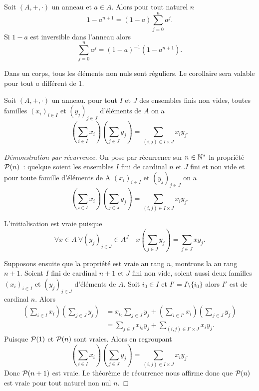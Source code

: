 \begin{corth}
  Soit \((A,+,\cdot)\) un anneau et \(a \in A\). Alors pour tout naturel \(n\)
  \begin{equation}
    1-a^{n+1}=(1-a)\sum_{j=0}^n a^j.
  \end{equation}
  Si \(1-a\) est inversible dans l'anneau alors
  \begin{equation}
    \sum_{j=0}^n a^j = (1-a)^{-1}(1-a^{n+1}).
  \end{equation}
\end{corth}
Dans un corps, tous les éléments non nuls sont réguliers. Le corollaire sera valable pour tout \(a\) différent de 1.

\begin{theo}
  Soit \((A,+,\cdot)\) un anneau. pour tout \(I\) et \(J\) des ensembles finis non vides, toutes familles \((x_i)_{i \in I}\) et \((y_j)_{j \in J}\) d'éléments de \(A\) on a
  \begin{equation}
    \left(\sum_{i \in I} x_i \right)\left(\sum_{j \in J} y_j \right) = \sum_{(i,j)\in I\times J} x_iy_j.
  \end{equation}
\end{theo}
\begin{proof}[Démonstration par récurrence]
  On pose par récurrence sur \(n \in \N^*\) la propriété \(\P(n)\)~: quelque soient les ensembles \(I\) fini de cardinal \(n\) et \(J\) fini et non vide et pour toute famille d'éléments de A \((x_i)_{i \in I}\) et \((y_j)_{j \in J}\) on a
\begin{equation} 
  \left(\sum_{i \in I} x_i \right)\left(\sum_{j \in J} y_j \right) = \sum_{(i,j)\in I\times J} x_iy_j.
\end{equation}

L'initialisation est vraie puisque
\begin{equation}
  \forall x \in A \ \forall (y_j)_{j \in J} \in A^J \quad x \left(\sum_{j \in J} y_j \right) = \sum_{j \in J} xy_j.
\end{equation}

Supposons ensuite que la propriété est vraie au rang \(n\), montrons la au rang \(n+1\). Soient \(I\) fini de cardinal \(n+1\) et \(J\) fini non vide, soient aussi deux familles \((x_i)_{i \in I}\) et \((y_j)_{j \in J}\) d'éléments de \(A\). Soit \(i_0 \in I\) et \(I'=I\setminus\{i_0\}\) alors \(I'\) est de cardinal \(n\). Alors
\begin{align}
  \left(\sum_{i \in I} x_i \right)\left(\sum_{j \in J} y_j \right) &=x_{i_0} \sum_{j \in J} y_j + \left(\sum_{i \in I'} x_i \right)\left(\sum_{j \in J} y_j \right) \\
&=\sum_{j \in J} x_{i_0}y_j +  \sum_{(i,j)\in I'\times J} x_iy_j.
\end{align}
Puisque \(\P(1)\) et \(\P(n)\) sont vraies. Alors en regroupant
\begin{equation}
  \left(\sum_{i \in I} x_i \right)\left(\sum_{j \in J} y_j \right) = \sum_{(i,j)\in I\times J} x_iy_j.
\end{equation}
Donc \(\P(n+1)\) est vraie. Le théorème de récurrence nous affirme donc que \(\P(n)\) est vraie pour tout naturel non nul \(n\).
\end{proof}
